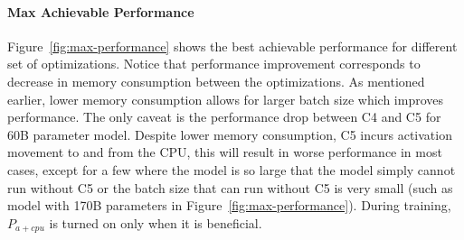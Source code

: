 

\paragraph{Max Achievable Performance}
Figure~\ref{fig:max-performance} shows the best achievable performance for different set of optimizations. Notice that performance improvement corresponds to decrease in memory consumption between the optimizations. As mentioned earlier, lower memory consumption allows for larger batch size which improves performance. The only caveat is the performance drop between C4 and C5 for 60B parameter model. Despite lower memory consumption, C5 incurs activation movement to and from the CPU, this will result in worse performance in most cases, except for a few where the model is so large that the model simply cannot run without C5 or the batch size that can run without C5 is very small (such as model with 170B parameters in Figure~\ref{fig:max-performance}). During training, $P_{a+cpu}$ is turned on only when it is beneficial.
